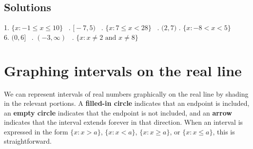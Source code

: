 \documentclass[11pt]{book}               %
\begin{document}
\subsection{Solutions} 
1.  $ \{ x : -1 \leq x \leq 10 \}$  \  .  $ \big[ -7, 5 \big) $   \ .  $ \{ x : 7 \leq x < 28 \}$  \  . $ \big( 2, 7 \big) $ .  $ \{ x : -8 < x < 5 \}$  \\
6. $ \big( 0, 6 \big] $  \ . $(-3,\infty)$ \ . $\{x : x\neq 2 \mbox{ and } x\neq 8\}$ \ \quad%

\newpage
\label{section_graphing-intervals}
\section{Graphing intervals on the real line}%

We can represent intervals of real numbers graphically on the real line by shading in the relevant portions. A \textbf{filled-in circle} indicates that an endpoint is included, an \textbf{empty circle} indicates that the endpoint is not included, and an \textbf{arrow} indicates that the interval extends forever in that direction. When an interval is expressed in the form $\{x : x>a\}$, $\{x : x<a\}$, $\{x : x\geq a\}$, or $\{x : x\leq a\}$, this is straightforward.
\end{document}
